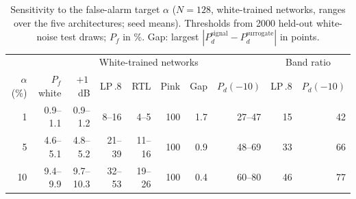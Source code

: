 \begin{table}[t]
\centering
\caption{Sensitivity to the false-alarm target $\alpha$ ($N=128$, white-trained networks, ranges over the five architectures; seed means). Thresholds from 2000 held-out white-noise test draws; $P_f$ in \%. Gap: largest $|P_d^{\mathrm{signal}}-P_d^{\mathrm{surrogate}}|$ in points.}
\label{tab:alpha}
\setlength{\tabcolsep}{4pt}
\begin{tabular}{rrrrrrrrrr}
\toprule
& \multicolumn{7}{c}{White-trained networks} & \multicolumn{2}{c}{Band ratio} \\
\cmidrule(lr){2-8}\cmidrule(lr){9-10}
$\alpha$ (\%) & $P_f$ white & $+1$\,dB & LP\,.8 & RTL & Pink & Gap & $P_d(-10)$ & LP\,.8 & $P_d(-10)$ \\
\midrule
1 & 0.9--1.1 & 0.9--1.2 & 8--16 & 4--5 & 100 & 1.7 & 27--47 & 15 & 42 \\
5 & 4.6--5.1 & 4.8--5.2 & 21--39 & 11--16 & 100 & 0.9 & 48--69 & 33 & 66 \\
10 & 9.4--9.9 & 9.7--10.3 & 32--53 & 19--26 & 100 & 0.4 & 60--80 & 46 & 77 \\
\bottomrule
\end{tabular}
\end{table}
